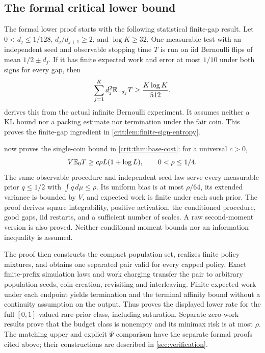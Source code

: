 \subsection{The formal critical lower bound}
The formal lower proof starts with the following statistical finite-gap result.
Let $0<d_j\le1/128$, $d_j/d_{j+1}\ge2$, and $\log K\ge32$.
One measurable test with an independent seed and observable stopping
time $T$ is run on iid Bernoulli flips of mean $1/2\pm d_j$.
If it has finite expected work and error at most $1/10$ under both
signs for every gap, then
\[
 \sum_{j=1}^K d_j^2\mathbb E_{-d_j}T\ge \frac{K\log K}{512}.
\]
derives this from the actual infinite Bernoulli experiment. It assumes
neither a KL bound nor a packing estimate nor termination under the fair
coin. This proves the finite-gap ingredient in
\cref{crit:lem:finite-sign-entropy}.

 now proves
the single-coin bound in \cref{crit:thm:base-cost}: for a universal $c>0$,
\[
 V\mathbb E_0T\ge c\rho L(1+\log L),\qquad 0<\rho\le1/4.
\]
The same observable procedure and independent seed law serve every
measurable prior $q\le1/2$ with $\int q\,d\mu\le\rho$. Its uniform
bias is at most $\rho/64$, its extended variance is bounded by $V$,
and expected work is finite under each such prior. The proof derives
square integrability, positive activation, the conditioned procedure,
good gaps, iid restarts, and a sufficient number of scales. A raw
second-moment version is also proved. Neither conditional moment
bounds nor an information inequality is assumed.

The proof then constructs the compact population set, realizes finite
policy mixtures, and obtains one separated pair valid for every capped
policy. Exact finite-prefix simulation laws and work charging transfer
the pair to arbitrary population seeds, coin creation, revisiting and
interleaving. Finite expected work under each endpoint yields termination
and the terminal affinity bound without a continuity assumption on the
output. Thus
proves the displayed lower rate for the full $[0,1]$-valued rare-prior
class, including saturation. Separate zero-work results prove that the
budget class is nonempty and its minimax risk is at most $\rho$.
The matching upper and explicit $\Psi$ comparison have the separate formal
proofs cited above; their constructions are described in \cref{sec:verification}.

